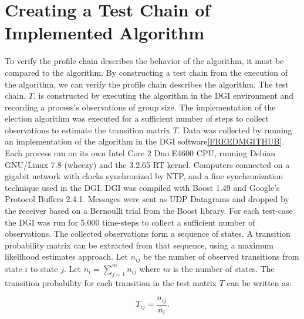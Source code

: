 
\section{Creating a Test Chain of Implemented Algorithm}

To verify the profile chain describes the behavior of the algorithm, it must be compared to the algorithm.
By constructing a test chain from the execution of the algorithm, we can verify the profile chain describes the algorithm.
The test chain, $T$, is constructed by executing the algorithm in the DGI environment and recording a process's observations of group size.
The implementation of the election algorithm was executed for a sufficient number of steps to collect observations to estimate the transition matrix $T$.
Data was collected by running an implementation of the algorithm in the DGI software\ref{FREEDMGITHUB}.
Each process ran on its own Intel Core 2 Duo E4600 CPU, running Debian GNU/Linux 7.8 (wheezy) and the 3.2.65 RT kernel.
Computers connected on a gigabit network with clocks synchronized by NTP, and a fine synchronization technique used in the DGI.
DGI was compiled with Boost\cite{BOOST} 1.49 and Google's Protocol Buffers\cite{PROTOBUF} 2.4.1.
Messages were sent as UDP Datagrams and dropped by the receiver based on a Bernoulli trial from the Boost library.
For each test-case the DGI was run for 5,000 time-steps to collect a sufficient number of observations.
The collected observations form a sequence of states.
A transition probability matrix can be extracted from that sequence, using a maximum likelihood estimates approach.
Let $n_{ij}$ be the number of observed transitions from state $i$ to state $j$. Let $n_{i}=\sum_{j=1}^{m} n_{ij}$ where $m$ is the number of states.
The transition probability for each transition in the test matrix $T$ can be written as:

\begin{equation} T_{ij} = \frac{n_{ij}}{n_{i}}. \end{equation}
